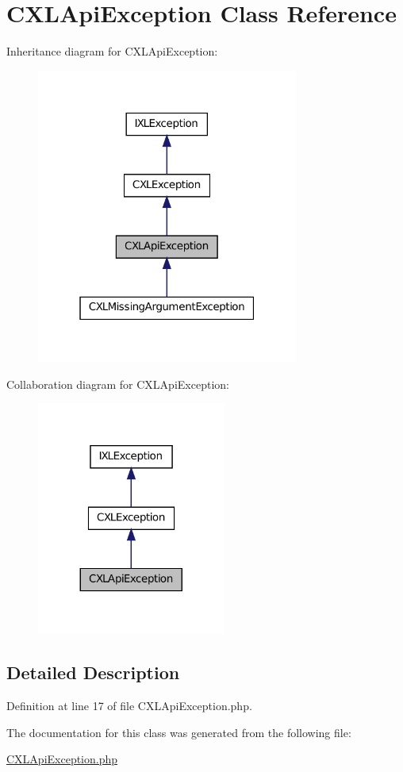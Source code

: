 \hypertarget{classCXLApiException}{
\section{CXLApiException Class Reference}
\label{classCXLApiException}
}


Inheritance diagram for CXLApiException:\nopagebreak
\begin{figure}[H]
\begin{center}
\leavevmode
\includegraphics[width=244pt]{classCXLApiException__inherit__graph}
\end{center}
\end{figure}


Collaboration diagram for CXLApiException:\nopagebreak
\begin{figure}[H]
\begin{center}
\leavevmode
\includegraphics[width=176pt]{classCXLApiException__coll__graph}
\end{center}
\end{figure}


\subsection{Detailed Description}


Definition at line 17 of file CXLApiException.php.



The documentation for this class was generated from the following file:\begin{DoxyCompactItemize}
\item 
\hyperlink{CXLApiException_8php}{CXLApiException.php}\end{DoxyCompactItemize}

